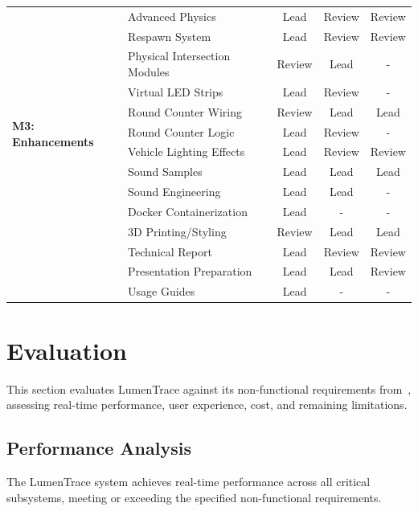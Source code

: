 \documentclass[10pt,journal,final,a4paper]{IEEEtran}
\begin{document}
\begin{table}[htb]
\begin{tabularx}{0.68\linewidth}{p{2.5cm} p{4.5cm} c c c}
        \midrule
        \multirow{12}{2.5cm}{\textbf{M3: Enhancements}}
            & Advanced Physics & Lead & Review & Review \\
            & Respawn System & Lead & Review & Review \\
            & Physical Intersection Modules & Review & Lead & - \\
            & Virtual LED Strips & Lead & Review & - \\
            & Round Counter Wiring & Review & Lead & Lead \\
            & Round Counter Logic & Lead & Review & - \\
            & Vehicle Lighting Effects & Lead & Review & Review \\
            & Sound Samples & Lead & Lead & Lead \\
            & Sound Engineering & Lead & Lead & - \\
            & Docker Containerization & Lead & - & - \\
            & 3D Printing/Styling & Review & Lead & Lead \\
        \midrule
        \multirow{2}{2.5cm}{\textbf{M4: Documentation}}
            & Technical Report & Lead & Review & Review \\
            & Presentation Preparation & Lead & Lead & Review \\
            & Usage Guides & Lead & - & - \\
        \bottomrule
    \end{tabularx}
\end{table}


\section{Evaluation}
\label{sec:evaluation}

This section evaluates LumenTrace against its non-functional requirements from~, assessing real-time performance, user experience, cost, and remaining limitations.

\subsection{Performance Analysis}
\label{subsec:performance-analysis}

The LumenTrace system achieves real-time performance across all critical subsystems, meeting or exceeding the specified non-functional requirements.
\end{document}
